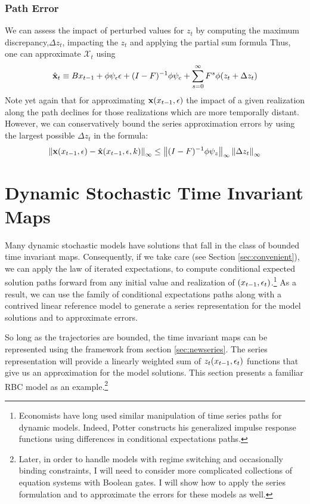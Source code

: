 \documentclass[12pt]{article}
\begin{document}
\subsubsection{Path Error}


We can assess the impact of perturbed values for $z_t$ by computing the maximum discrepancy,$\Delta z_t$, impacting the $z_t$ and applying the 
partial sum formula
Thus, one can  approximate $\mathcal{X}_t$ using
 	 \begin{gather}
 	 \hat{\mathbf{x}}_t \equiv B x_{t-1}+ \phi \psi_\epsilon\epsilon  + (I - F)^{-1} \phi \psi_c + \sum_{s=0}^\infty F^s \phi (z_{t}+\Delta z_{t})\label{theDeltaSeries}
 \end{gather}
Note yet again that for approximating $\mathbf{x}(x_{t-1},\epsilon)$ the impact of  a given realization along the path declines for those realizations which are  more temporally distant.
However, we can conservatively bound the  series approximation  errors by using the largest possible $\Delta z_t$ in the formula:
    \begin{gather}
\left\lVert\mathbf{x}(x_{t-1},\epsilon)-\hat{\mathbf{x}}(x_{t-1},\epsilon,k)\right\rVert_\infty \le \left\lVert(I -F)^{-1} \phi \psi_z\right\rVert_\infty  \left\lVert\Delta z_t \right\rVert_\infty \label{pathErr}
    \end{gather}


\label{sec:pathnorm}

\section{Dynamic Stochastic Time Invariant Maps}
\label{sec:extToMaps}

Many dynamic stochastic models have solutions that 
fall in the class of bounded time invariant maps.
Consequently, if we take care (see Section \ref{sec:convenient}), we can apply the law of iterated expectations, 
to compute conditional expected solution paths 
forward from any initial value and realization of $(x_{t-1},\epsilon_t)$.\footnote{Economists have long used similar manipulation of
time series paths for dynamic models. 
Indeed, Potter constructs his generalized impulse response functions using
differences in conditional expectations paths\citep{Potter2000,Koop1996a}.
}
As a result, we can use the family of conditional expectations paths 
along with a contrived linear reference model to generate
a series representation for the model solutions  and
to approximate errors.

So long as the trajectories are 
 bounded, the time invariant maps can 
be represented using the framework from section \ref{sec:newseries}.
The series representation will provide a linearly weighted sum of $z_t(x_{t-1},\epsilon_t)$ functions that give us an approximation for the model solutions.
This section presents a familiar RBC model as an example.\footnote{
Later, in order to handle models with regime switching and occasionally binding constraints, I will need to consider more complicated collections 
of equation systems with  Boolean gates. I will show how to apply the 
series formulation and to approximate the  errors for these models as well.}
\end{document}
